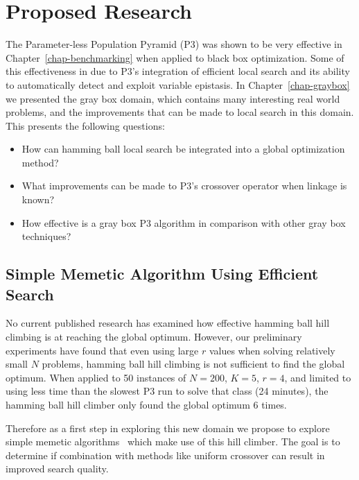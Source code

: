 \chapter{Proposed Research}
The Parameter-less Population Pyramid (P3) was shown to be very effective in Chapter~\ref{chap-benchmarking}
when applied to black box optimization. Some of this effectiveness in due to P3's integration of
efficient local search and its ability to automatically detect and exploit variable epistasis.
In Chapter~\ref{chap-graybox} we presented the gray box domain, which contains many interesting
real world problems, and the improvements that can be made to local search in this domain.
This presents the following questions:

\begin{itemize}
\item How can hamming ball local search be integrated into a global optimization method?
\item What improvements can be made to P3's crossover operator when linkage is known?
\item How effective is a gray box P3 algorithm in comparison with other gray box techniques?
\end{itemize}

\section{Simple Memetic Algorithm Using Efficient Search}
No current published research has examined how effective hamming ball hill climbing is at reaching the global
optimum. However, our preliminary experiments have found that even using large $r$ values when solving relatively small $N$
problems, hamming ball hill climbing is not sufficient to find the global optimum. When applied to 50 instances
of $N=200$, $K=5$, $r=4$, and limited to using less time than the slowest P3 run to solve that class (24 minutes),
the hamming ball hill climber only found the global optimum 6 times.

Therefore as a first step in exploring this new domain we propose to explore simple memetic algorithms~\cite{chen:2011:memetic}
which make use of this hill climber. The goal is to determine if combination with methods like uniform crossover
can result in improved search quality.

